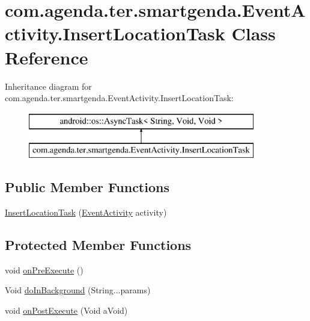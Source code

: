 \hypertarget{classcom_1_1agenda_1_1ter_1_1smartgenda_1_1_event_activity_1_1_insert_location_task}{\section{com.\-agenda.\-ter.\-smartgenda.\-Event\-Activity.\-Insert\-Location\-Task Class Reference}
\label{classcom_1_1agenda_1_1ter_1_1smartgenda_1_1_event_activity_1_1_insert_location_task}
}
Inheritance diagram for com.\-agenda.\-ter.\-smartgenda.\-Event\-Activity.\-Insert\-Location\-Task\-:\begin{figure}[H]
\begin{center}
\leavevmode
\includegraphics[height=2.000000cm]{classcom_1_1agenda_1_1ter_1_1smartgenda_1_1_event_activity_1_1_insert_location_task}
\end{center}
\end{figure}
\subsection*{Public Member Functions}
\begin{DoxyCompactItemize}
\item 
\hyperlink{classcom_1_1agenda_1_1ter_1_1smartgenda_1_1_event_activity_1_1_insert_location_task_a0ee63827cf3b5720b648d7cb99873f92}{Insert\-Location\-Task} (\hyperlink{classcom_1_1agenda_1_1ter_1_1smartgenda_1_1_event_activity}{Event\-Activity} activity)
\end{DoxyCompactItemize}
\subsection*{Protected Member Functions}
\begin{DoxyCompactItemize}
\item 
void \hyperlink{classcom_1_1agenda_1_1ter_1_1smartgenda_1_1_event_activity_1_1_insert_location_task_a250d5a4b6b0236ebbc2e5a914e9ce234}{on\-Pre\-Execute} ()
\item 
Void \hyperlink{classcom_1_1agenda_1_1ter_1_1smartgenda_1_1_event_activity_1_1_insert_location_task_a1d46779692302e88c98ea575ae0861f0}{do\-In\-Background} (String...\-params)
\item 
void \hyperlink{classcom_1_1agenda_1_1ter_1_1smartgenda_1_1_event_activity_1_1_insert_location_task_a0ef28fbc7d44012610f823394b853c62}{on\-Post\-Execute} (Void a\-Void)
\end{DoxyCompactItemize}


